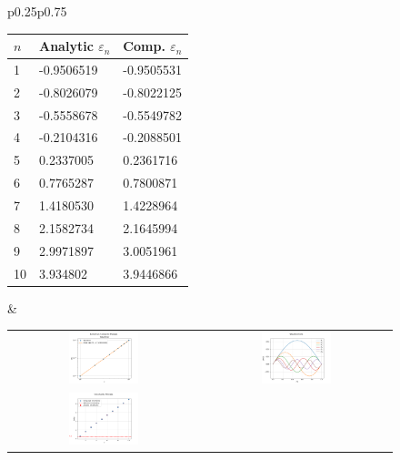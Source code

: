 \documentclass[10pt,a4paper]{article}
\theoremstyle{definition}
\theoremstyle{remark}
\begin{document}
\begin{figure}[h]
    \begin{tabular}{p{}p{}}
        \begin{tabular}{|p{}|p{}|p{}|}
            \hline
            $n$&Analytic $\varepsilon_n$&Comp. $\varepsilon_n$\\
            \hline
            1 & -0.9506519 & -0.9505531\\
            2 & -0.8026079 & -0.8022125\\
            3 & -0.5558678 & -0.5549782\\
            4 & -0.2104316 & -0.2088501\\
            5 & 0.2337005 & 0.2361716\\
            6 & 0.7765287 & 0.7800871\\
            7 & 1.4180530 & 1.4228964\\
            8 & 2.1582734 & 2.1645994\\
            9 & 2.9971897 & 3.0051961\\
            10 & 3.934802 & 3.9446866\\
            \hline
        \end{tabular}&
            \begin{tabular}{cc}
                \includegraphics[width=0.38\textwidth]{energy_error_nu.pdf} &
                \includegraphics[width=0.38\textwidth]{wavefunctions_nu.pdf}\\
                \includegraphics[width=0.38\textwidth]{uncertainty_principle_for_nu.pdf} &

\end{tabular}
\end{tabular}
\end{figure}
\end{document}
